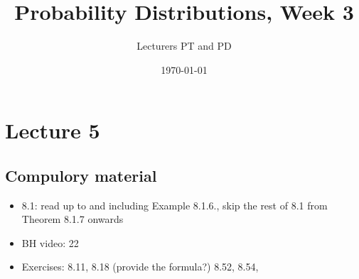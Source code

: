 \documentclass[a4paper,11pt]{article}
\author{Lecturers PT and PD
}
\date{\today}
\title{Probability Distributions, Week 3}
\begin{document}
\maketitle
\tableofcontents

\section{Lecture 5}

\subsection{Compulory material}
\label{sec:compulory-material}



\begin{itemize}
\item 8.1: read up  to and including Example 8.1.6., skip the rest of 8.1 from Theorem 8.1.7  onwards
\item BH video: 22
\item Exercises: 8.11, 8.18 (provide the formula?) 8.52, 8.54,
\end{itemize}
\end{document}
